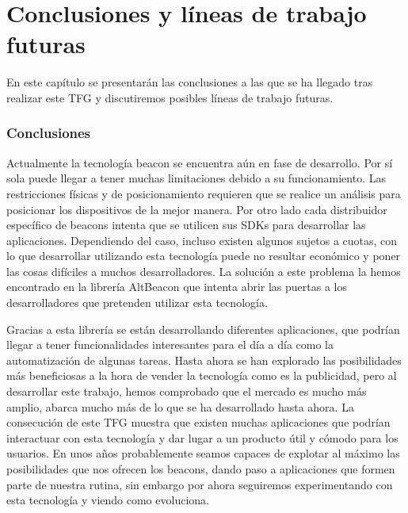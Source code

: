 %
%
%

\chapter{Conclusiones y líneas de trabajo futuras} \label{chap:Conclusiones} 

En este capítulo se presentarán las conclusiones a las que se ha llegado tras realizar este TFG y discutiremos posibles líneas de trabajo futuras.

\subsection{Conclusiones}

Actualmente la tecnología beacon se encuentra aún en fase de desarrollo. Por sí sola puede llegar a tener muchas limitaciones debido a su funcionamiento. Las restricciones físicas y de posicionamiento requieren que se realice un análisis para posicionar los dispositivos de la mejor manera. Por otro lado cada distribuidor específico de beacons intenta que se utilicen sus SDKs para desarrollar las aplicaciones. Dependiendo del caso, incluso existen algunos sujetos a cuotas, con lo que desarrollar utilizando esta tecnología puede no resultar económico y poner las cosas difíciles a muchos desarrolladores. La solución a este problema la hemos encontrado en la librería AltBeacon que intenta abrir las puertas a los desarrolladores que pretenden utilizar esta tecnología.


Gracias a esta librería se están desarrollando diferentes aplicaciones, que podrían llegar a tener funcionalidades interesantes para el día a día como la automatización de algunas tareas. Hasta ahora se han explorado las posibilidades más beneficiosas a la hora de vender la tecnología como es la publicidad, pero al desarrollar este trabajo, hemos comprobado que el mercado es mucho más amplio, abarca mucho más de lo que se ha desarrollado hasta ahora. La consecución de este TFG muestra que existen muchas aplicaciones que podrían interactuar con esta tecnología y dar lugar a un producto útil y cómodo para los usuarios. En unos años probablemente seamos capaces de explotar al máximo las posibilidades que nos ofrecen los beacons, dando paso a aplicaciones que formen parte de nuestra rutina, sin embargo por ahora seguiremos experimentando con esta tecnología y viendo como evoluciona.


